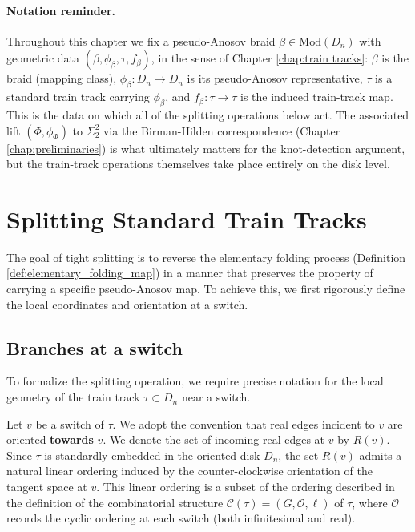 \paragraph{Notation reminder.} Throughout this chapter we fix a pseudo-Anosov braid $\beta \in \mathrm{Mod}(D_n)$ with geometric data $(\beta, \phi_\beta, \tau, f_\beta)$, in the sense of Chapter \ref{chap:train tracks}: $\beta$ is the braid (mapping class), $\phi_\beta \colon D_n \to D_n$ is its pseudo-Anosov representative, $\tau$ is a standard train track carrying $\phi_\beta$, and $f_\beta \colon \tau \to \tau$ is the induced train-track map. This is the data on which all of the splitting operations below act. The associated lift $(\Phi, \phi_\Phi)$ to $\Sigma_2^2$ via the Birman-Hilden correspondence (Chapter \ref{chap:preliminaries}) is what ultimately matters for the knot-detection argument, but the train-track operations themselves take place entirely on the disk level.

\section{Splitting Standard Train Tracks}
\label{sec:splitting-standard}

The goal of tight splitting is to reverse the elementary folding process (Definition \ref{def:elementary_folding_map}) in a manner that preserves the property of carrying a specific pseudo-Anosov map. To achieve this, we first rigorously define the local coordinates and orientation at a switch.

\subsection{Branches at a switch}
\label{subsec:local-coordinates}

To formalize the splitting operation, we require precise notation for the local geometry of the train track $\tau \subset D_n$ near a switch.

\begin{definition}
Let $v$ be a switch of $\tau$. We adopt the convention that real edges incident to $v$ are oriented \textbf{towards} $v$. We denote the set of incoming real edges at $v$ by $R(v)$. Since $\tau$ is standardly embedded in the oriented disk $D_n$, the set $R(v)$ admits a natural linear ordering induced by the counter-clockwise orientation of the tangent space at $v$. This linear ordering is a subset of the ordering described in the definition of the combinatorial structure $\mathcal{C}(\tau) = (G,\mathcal{O},\ell)$ of $\tau$, where $\mathcal{O}$ records the cyclic ordering at each switch (both infinitesimal and real).
\end{definition}

